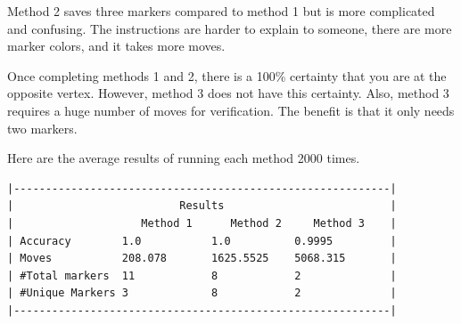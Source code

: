 \documentclass{article}
\begin{document}
Method 2 saves three markers compared to method 1 but is more complicated and confusing. The instructions are harder to explain to someone, there are more marker colors, and it takes more moves.

Once completing methods 1 and 2, there is a 100\% certainty that you are at the opposite vertex. However, method 3 does not have this certainty. Also, method 3 requires a huge number of moves for verification. The benefit is that it only needs two markers.


Here are the average results of running each method 2000 times.
\begin{lstlisting}
|-----------------------------------------------------------|
|                          Results                          |
|                    Method 1      Method 2     Method 3    |
| Accuracy        1.0           1.0          0.9995         |
| Moves           208.078       1625.5525    5068.315       |
| #Total markers  11            8            2              |
| #Unique Markers 3             8            2              |
|-----------------------------------------------------------|
\end{lstlisting}
\end{document}
